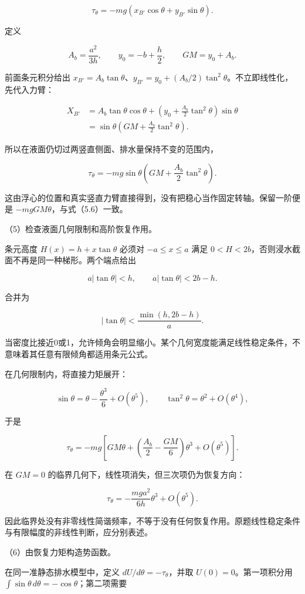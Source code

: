 \documentclass[12pt,a4paper,fontset=fandol]{ctexart}
\begin{document}
\[
\tau_\theta=-mg(x_{B'}\cos\theta+y_{B'}\sin\theta).
\]

定义

\[
A_b=\frac{a^2}{3h},\qquad y_0=-b+\frac h2,\qquad
GM=y_0+A_b.
\]

前面条元积分给出
\(x_{B'}=A_b\tan\theta\)、\(y_{B'}=y_0+(A_b/2)\tan^2\theta\)。不立即线性化，先代入力臂：

\[
\begin{aligned}
X_{B'}
&=A_b\tan\theta\cos\theta
+\left(y_0+\frac{A_b}{2}\tan^2\theta\right)\sin\theta\\
&=\sin\theta\left(GM+\frac{A_b}{2}\tan^2\theta\right).
\end{aligned}
\]

所以在液面仍切过两竖直侧面、排水量保持不变的范围内，

\[
\tau_\theta=-mg\sin\theta
\left(GM+\frac{A_b}{2}\tan^2\theta\right).
\]

这由浮心的位置和真实竖直力臂直接得到，没有把稳心当作固定转轴。保留一阶便是
\(-mgGM\theta\)，与式（5.6）一致。

（5）检查液面几何限制和高阶恢复作用。

条元高度 \(H(x)=h+x\tan\theta\) 必须对 \(-a\le x\le a\) 满足
\(0<H<2b\)，否则浸水截面不再是同一种梯形。两个端点给出

\[
a|\tan\theta|<h,\qquad
a|\tan\theta|<2b-h.
\]

合并为

\[
|\tan\theta|<\frac{\min(h,2b-h)}a.
\]

当密度比接近0或1，允许倾角会明显缩小。某个几何宽度能满足线性稳定条件，不意味着其任意有限倾角都适用条元公式。

在几何限制内，将直接力矩展开：

\[
\sin\theta=\theta-\frac{\theta^3}{6}+O(\theta^5),\qquad
\tan^2\theta=\theta^2+O(\theta^4),
\]

于是

\[
\tau_\theta=-mg\left[
GM\theta+\left(\frac{A_b}{2}-\frac{GM}{6}\right)\theta^3
+O(\theta^5)\right].
\]

在 \(GM=0\) 的临界几何下，线性项消失，但三次项仍为恢复方向：

\[
\tau_\theta=-\frac{mga^2}{6h}\theta^3+O(\theta^5).
\]

因此临界处没有非零线性简谐频率，不等于没有任何恢复作用。原题线性稳定条件与有限幅度的非线性判断，应分别表述。

（6）由恢复力矩构造势函数。

在同一准静态排水模型中，定义 \(dU/d\theta=-\tau_\theta\)，并取
\(U(0)=0\)。第一项积分用
\(\int\sin\theta\,d\theta=-\cos\theta\)；第二项需要
\end{document}
